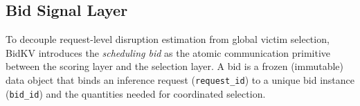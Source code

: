 \documentclass[sigconf,nonacm]{acmart}
\newcommand{\bidkv}{BidKV\xspace}
\newcommand{\utilfn}{\ensuremath{U}}
\newcommand{\tokfree}{\ensuremath{r}}
\newcommand{\qualdelta}{\ensuremath{\delta}}
\newcommand{\stabeps}{\ensuremath{\varepsilon}}
\begin{document}



\subsection{Bid Signal Layer}\label{sec:design:bid}

To decouple request-level disruption estimation from global victim selection,
\bidkv introduces the \emph{scheduling bid} as the atomic communication
primitive between the scoring layer and the selection layer. A bid is a frozen
(immutable) data object that binds an inference request
(\texttt{request\_id}) to a unique bid instance (\texttt{bid\_id}) and the
quantities needed for coordinated selection.
\end{document}
